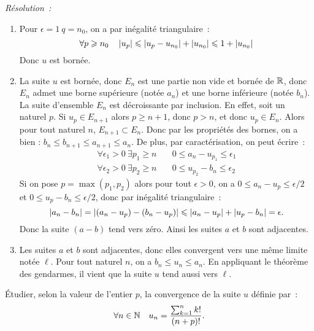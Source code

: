\emph{Résolution~:}
\begin{enumerate}
    \item Pour \(\epsilon = 1 \ q = n_0\), on a par inégalité
        triangulaire~:
        \[ \forall p \geqslant n_0 \quad \left\lvert u_p\right\rvert \leqslant \left\lvert u_p -
        u_{n_0}\right\rvert + \left\lvert u_{n_0}\right\rvert \leqslant 1 + \left\lvert u_{n_0}\right\rvert\]
        Donc \(u\) est bornée.
    \item La suite \(u\) est bornée, donc \(E_n\) est une partie non vide
        et bornée de \(\mathbb{R}\), donc \(E_n\) admet une borne supérieure (notée
        \(a_n\)) et une borne inférieure (notée \(b_n\)). La suite
        d'ensemble \(E_n\) est décroissante par inclusion. En effet, soit un
        naturel \(p\). Si \(u_p \in E_{n+1}\) alors \(p \geqslant n+1\),
        donc \(p > n\), et donc \(u_p \in E_n\). Alors pour tout naturel
        \(n\), \(E_{n+1} \subset E_n\). Donc par les propriétés des bornes,
        on a bien : \(b_n \leqslant b_{n+1} \leqslant a_{n+1} \leqslant
        a_n\). De plus, par caractérisation, on peut écrire~:
        \begin{align*}
            \forall \epsilon_1 >0 \ \exists p_1 \geqslant n & \quad 0
            \leqslant a_n - u_{p_1} \leqslant \epsilon_1 \\
            \forall \epsilon_2 >0 \ \exists p_2 \geqslant n & \quad 0
            \leqslant u_{p_2} - b_n \leqslant \epsilon_2
        \end{align*}
        Si on pose \(p = \max(p_1,p_2)\) alors pour tout \(\epsilon>0\), on
        a \(0 \leqslant a_n-u_p \leqslant \epsilon/2\) et \(0 \leqslant
        u_p-b_n \leqslant \epsilon/2\), donc par inégalité triangulaire~:
        \[ \left\lvert a_n - b_n\right\rvert = \left\lvert(a_n-u_p) - (b_n-u_p)\right\rvert \leqslant
        \left\lvert a_n-u_p\right\rvert + \left\lvert u_p-b_n\right\rvert = \epsilon. \]
        Donc la suite \((a-b)\) tend vers zéro. Ainsi les suites \(a\) et
        \(b\) sont adjacentes.
    \item Les suites \(a\) et \(b\) sont adjacentes, donc elles convergent
        vers une même limite notée \(\ell\). Pour tout naturel \(n\), on a
        \(b_n \leqslant u_n \leqslant a_n\). En appliquant le théorème des
        gendarmes, il vient que la suite \(u\) tend aussi vers \(\ell\).
\end{enumerate}
\begin{exercice}
    Étudier, selon la valeur de l'entier \(p\), la convergence de la suite
    \(u\) définie par~: \[\forall n \in \mathbb{N} \quad u_n = \frac{\sum_{k =
    1}^n k!}{(n+p)!}.\]
\end{exercice}

